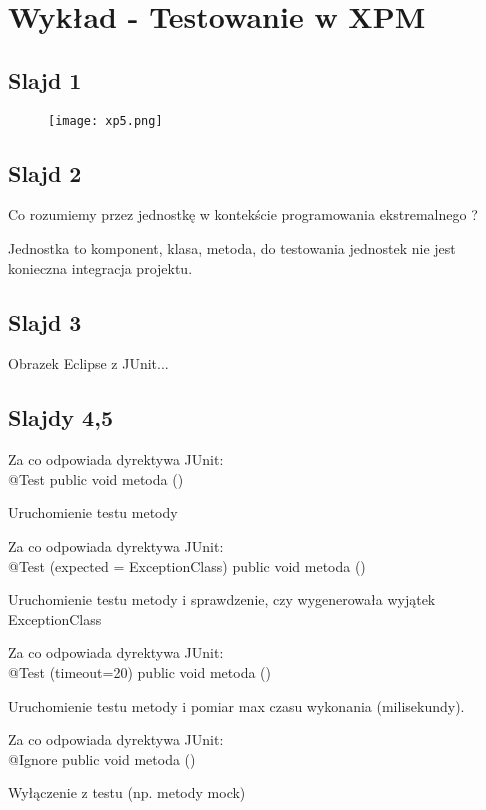 \documentclass[a4paper,15pt]{article}
\begin{document}
\newpage
\section{Wykład - Testowanie w XPM}

\subsection{Slajd 1}
\begin{figure}[H]
\centerline{\texttt{[image: xp5.png]}}
\end{figure}

\subsection{Slajd 2}
\begin{framed}
Co rozumiemy przez jednostkę w kontekście programowania ekstremalnego ?
\end{framed}
Jednostka to komponent, klasa, metoda, do testowania jednostek nie jest konieczna integracja projektu.

\subsection{Slajd 3}
Obrazek Eclipse z JUnit...

\subsection{Slajdy 4,5}
\begin{framed}
Za co odpowiada dyrektywa JUnit: \\
@Test public void metoda () 
\end{framed}
Uruchomienie testu metody

\begin{framed}
Za co odpowiada dyrektywa JUnit: \\
@Test (expected = ExceptionClass) public void metoda ()
\end{framed}
Uruchomienie testu metody i sprawdzenie, czy wygenerowała wyjątek ExceptionClass

\begin{framed}
Za co odpowiada dyrektywa JUnit: \\
@Test (timeout=20) public void metoda () 
\end{framed}
Uruchomienie testu metody i pomiar max czasu wykonania (milisekundy).

\begin{framed}
Za co odpowiada dyrektywa JUnit: \\
@Ignore public void metoda () 
\end{framed}
Wyłączenie z testu (np. metody mock)
\end{document}
